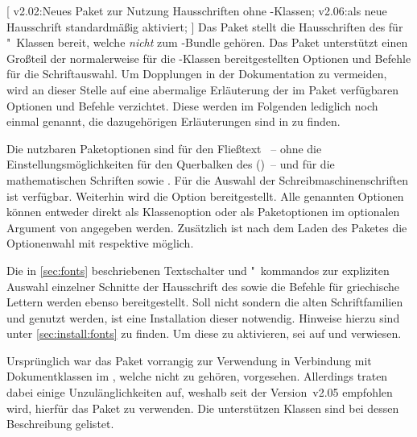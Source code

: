 \begin{DeclareEntity}{}[%
  v2.02:Neues Paket zur Nutzung Hausschriften ohne \TUDScript-Klassen;%
  v2.06:\OpenSans als neue Hausschrift standardmäßig aktiviert;%
]
%
Das Paket  stellt die Hausschriften des \TUDCDs für 
"~Klassen bereit, welche \emph{nicht} zum \TUDScript-Bundle 
gehören. Das Paket unterstützt einen Großteil der normalerweise für die 
\TUDScript-Klassen bereitgestellten Optionen und Befehle für die 
Schriftauswahl. Um Dopplungen in der Dokumentation zu vermeiden, wird an dieser 
Stelle auf eine abermalige Erläuterung der im Paket  
verfügbaren Optionen und Befehle verzichtet. Diese werden im Folgenden 
lediglich noch einmal genannt, die dazugehörigen Erläuterungen sind in 
 zu finden.

Die nutzbaren Paketoptionen sind für den Fließtext ~-- ohne die 
Einstellungsmöglichkeiten für den Querbalken des \CDs ()~-- und 
für die mathematischen Schriften  sowie . 
Für die Auswahl der Schreibmaschinenschriften ist  verfügbar. 
Weiterhin wird die Option  bereitgestellt. Alle genannten 
Optionen können entweder direkt als Klassenoption oder als Paketoptionen im 
optionalen Argument von 
 angegeben 
werden. Zusätzlich ist nach dem Laden des Paketes die Optionenwahl mit 
 respektive  möglich.

Die in \autoref{sec:fonts} beschriebenen Textschalter und "~kommandos zur 
expliziten Auswahl einzelner Schnitte der Hausschrift des \CDs sowie die 
Befehle für griechische Lettern werden ebenso bereitgestellt.
%
Soll nicht \OpenSans sondern die alten Schriftfamilien \Univers und \DIN 
genutzt werden, ist eine Installation dieser notwendig. Hinweise hierzu sind 
unter \autoref{sec:install:fonts} zu finden. Um diese zu aktivieren, sei auf 
 und  verwiesen.

%
Ursprünglich war das Paket  vorrangig zur Verwendung in 
Verbindung mit Dokumentklassen im \TUDCD, welche nicht zu \TUDScript gehören, 
vorgesehen. Allerdings traten dabei einige Unzulänglichkeiten auf, weshalb seit 
der Version~v2.05 empfohlen wird, hierfür das Paket  
zu verwenden. Die unterstützen Klassen sind bei dessen Beschreibung gelistet. 
\end{DeclareEntity}



